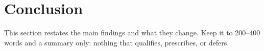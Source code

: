 \section{Conclusion} \label{sec:conclusion}

This section restates the main findings and what they change. Keep it to 200--400 words and a summary only: nothing that qualifies, prescribes, or defers.
